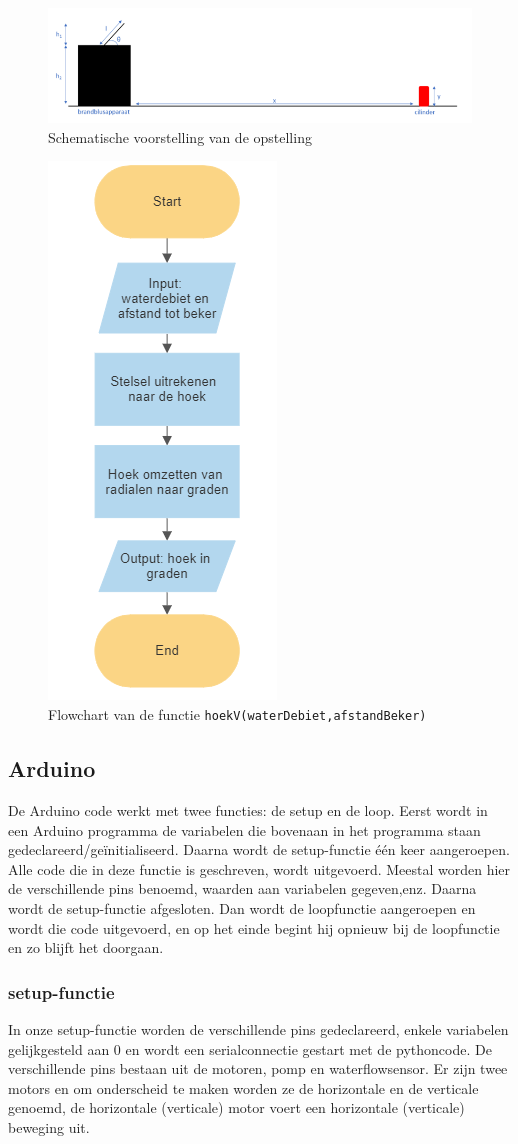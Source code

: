 \documentclass[kulak]{kulakarticle} %
\begin{document}
				\begin{figure} [h!]
					\centering
					\includegraphics[width = 1 \textwidth]{schematische voorstelling water LATEX}
					\caption{Schematische voorstelling van de opstelling}
					\label{schematische voorstelling}
				\end{figure}

				\begin{figure} [h!]
					\centering
					\includegraphics[width = .2 \textwidth]{flowchart_hoekV}
				\cprotect\caption{Flowchart van de functie \verb*|hoekV(waterDebiet,afstandBeker)|}
					\label{flowchart_water}
				\end{figure}


	\subsection{Arduino}
	
		De Arduino code werkt met twee functies: de setup en de loop. Eerst wordt in een Arduino programma de variabelen die bovenaan in het programma staan gedeclareerd/geïnitialiseerd. Daarna wordt de setup-functie één keer aangeroepen. Alle code die in deze functie is geschreven, wordt uitgevoerd. Meestal worden hier de verschillende pins benoemd, waarden aan variabelen gegeven,enz. Daarna wordt de setup-functie afgesloten. Dan wordt de loopfunctie aangeroepen en wordt die code uitgevoerd, en op het einde begint hij opnieuw bij de loopfunctie en zo blijft het doorgaan.
		
		
		\subsubsection{setup-functie}
			In onze setup-functie worden de verschillende pins gedeclareerd, enkele variabelen gelijkgesteld aan 0 en wordt een serialconnectie gestart met de pythoncode. De verschillende pins bestaan uit de motoren, pomp en waterflowsensor. Er zijn twee motors en om onderscheid te maken worden ze de horizontale en de verticale genoemd, de horizontale (verticale) motor voert een horizontale (verticale) beweging uit.
			
\end{document}
